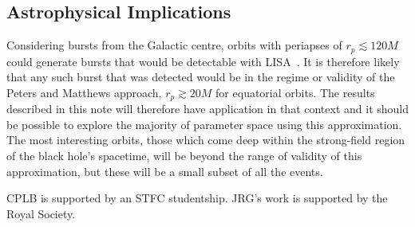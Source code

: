 \documentclass[aps,prd,amsfonts,amssymb,amsmath,nofootinbib,floatfix,reprint,showpacs,groupedaddress]{revtex4-1}
\begin{document}
\subsection{Astrophysical Implications}

Considering bursts from the Galactic centre, orbits with periapses of $r_{p} \lesssim 120 M$ could generate bursts that would be detectable with LISA~\cite{Rubbo2006, Hopman2007}. It is therefore likely that any such burst that was detected would be in the regime or validity of the Peters and Matthews approach, $r_{p} \gtrsim 20 M$ for equatorial orbits. The results described in this note will therefore have application in that context and it should be possible to explore the majority of parameter space using this approximation. The most interesting orbits, those which come deep within the strong-field region of the black hole's spacetime, will be beyond the range of validity of this approximation, but these will be a small subset of all the events.

\begin{acknowledgments}
CPLB is supported by an STFC studentship. JRG's work is supported by the Royal Society.
\end{acknowledgments}


\end{document}
